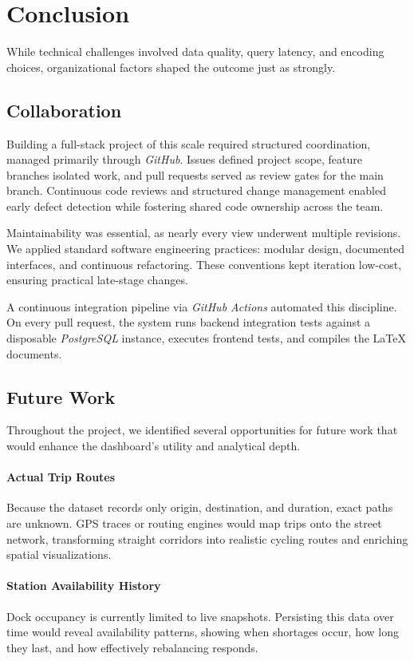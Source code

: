 \section{Conclusion}\label{sec:conclusion}
While technical challenges involved data quality, query latency, and encoding choices, organizational factors shaped the outcome just as strongly.

\subsection{Collaboration}
Building a full-stack project of this scale required structured coordination, managed primarily through \emph{GitHub}.
Issues defined project scope, feature branches isolated work, and pull requests served as review gates for the main branch.
Continuous code reviews and structured change management enabled early defect detection while fostering shared code ownership across the team.

Maintainability was essential, as nearly every view underwent multiple revisions.
We applied standard software engineering practices: modular design, documented interfaces, and continuous refactoring.
These conventions kept iteration low-cost, ensuring practical late-stage changes.

A continuous integration pipeline via \emph{GitHub Actions} automated this discipline.
On every pull request, the system runs backend integration tests against a disposable \emph{PostgreSQL} instance, executes frontend tests, and compiles the LaTeX documents.

\subsection{Future Work}
Throughout the project, we identified several opportunities for future work that would enhance the dashboard's utility and analytical depth.

\paragraph{Actual Trip Routes}
Because the dataset records only origin, destination, and duration, exact paths are unknown.
GPS traces or routing engines would map trips onto the street network, transforming straight corridors into realistic cycling routes and enriching spatial visualizations.

\paragraph{Station Availability History}
Dock occupancy is currently limited to live snapshots.
Persisting this data over time would reveal availability patterns, showing when shortages occur, how long they last, and how effectively rebalancing responds.

